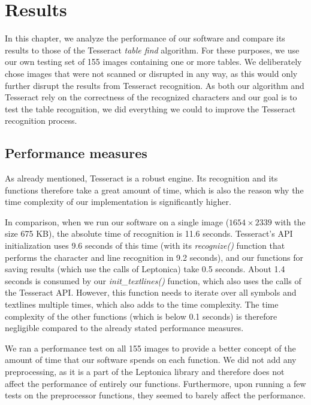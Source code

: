 \chapter{Results}

In this chapter, we analyze the performance of our software and compare its results to those of the Tesseract \emph{table find} algorithm. For these purposes, we use our own testing set of 155 images containing one or more tables. We deliberately chose images that were not scanned or disrupted in any way, as this would only further disrupt the results from Tesseract recognition. As both our algorithm and Tesseract rely on the correctness of the recognized characters and our goal is to test the table recognition, we did everything we could to improve the Tesseract recognition process. 

\section{Performance measures}

As already mentioned, Tesseract is a robust engine. Its recognition and its functions therefore take a great amount of time, which is also the reason why the time complexity of our implementation is significantly higher.

In comparison, when we run our software on a single image ($1654\times2339$ with the size 675 KB), the absolute time of recognition is 11.6 seconds. Tesseract's API initialization uses 9.6 seconds of this time (with its \emph{recognize()} function that performs the character and line recognition in 9.2 seconds), and our functions for saving results (which use the calls of Leptonica) take 0.5 seconds. About 1.4 seconds is consumed by our \emph{init\_textlines()} function, which also uses the calls of the Tesseract API. However, this function needs to iterate over all symbols and textlines multiple times, which also adds to the time complexity. The time complexity of the other functions (which is below 0.1 seconds) is therefore negligible compared to the already stated performance measures.

We ran a performance test on all 155 images to provide a better concept of the amount of time that our software spends on each function. We did not add any preprocessing, as it is a part of the Leptonica library and therefore does not affect the performance of entirely our functions. Furthermore, upon running a few tests on the preprocessor functions, they seemed to barely affect the performance.


